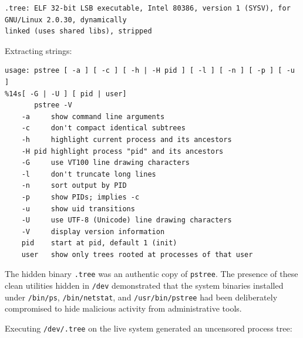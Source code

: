 \vspace{1em}

\begin{lstlisting}[style=terminal]
.tree: ELF 32-bit LSB executable, Intel 80386, version 1 (SYSV), for GNU/Linux 2.0.30, dynamically 
linked (uses shared libs), stripped
\end{lstlisting}

\vspace{1em}

Extracting strings:

\vspace{1em}

\begin{lstlisting}[style=terminal]
usage: pstree [ -a ] [ -c ] [ -h | -H pid ] [ -l ] [ -n ] [ -p ] [ -u ]
%14s[ -G | -U ] [ pid | user]
       pstree -V
    -a     show command line arguments
    -c     don't compact identical subtrees
    -h     highlight current process and its ancestors
    -H pid highlight process "pid" and its ancestors
    -G     use VT100 line drawing characters
    -l     don't truncate long lines
    -n     sort output by PID
    -p     show PIDs; implies -c
    -u     show uid transitions
    -U     use UTF-8 (Unicode) line drawing characters
    -V     display version information
    pid    start at pid, default 1 (init)
    user   show only trees rooted at processes of that user
\end{lstlisting}

\vspace{1em}

The hidden binary \texttt{.tree} was an authentic copy of \texttt{pstree}. The presence of these clean utilities hidden in \texttt{/dev} demonstrated that the system binaries installed under \texttt{/bin/ps}, \texttt{/bin/netstat}, and \texttt{/usr/bin/pstree} had been deliberately compromised to hide malicious activity from administrative tools.

Executing \texttt{/dev/.tree} on the live system generated an uncensored process tree:

\vspace{1em}

